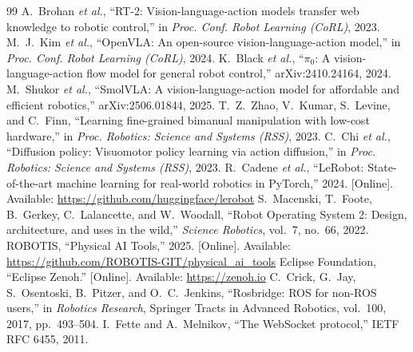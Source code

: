 \documentclass[conference]{IEEEtran}
\begin{document}
\begin{thebibliography}{99}
 A.~Brohan \emph{et al.}, ``RT-2: Vision-language-action models transfer web knowledge to robotic control,'' in \emph{Proc. Conf. Robot Learning (CoRL)}, 2023.
 M.~J.~Kim \emph{et al.}, ``OpenVLA: An open-source vision-language-action model,'' in \emph{Proc. Conf. Robot Learning (CoRL)}, 2024.
 K.~Black \emph{et al.}, ``$\pi_0$: A vision-language-action flow model for general robot control,'' arXiv:2410.24164, 2024.
 M.~Shukor \emph{et al.}, ``SmolVLA: A vision-language-action model for affordable and efficient robotics,'' arXiv:2506.01844, 2025.
 T.~Z.~Zhao, V.~Kumar, S.~Levine, and C.~Finn, ``Learning fine-grained bimanual manipulation with low-cost hardware,'' in \emph{Proc. Robotics: Science and Systems (RSS)}, 2023.
 C.~Chi \emph{et al.}, ``Diffusion policy: Visuomotor policy learning via action diffusion,'' in \emph{Proc. Robotics: Science and Systems (RSS)}, 2023.
 R.~Cadene \emph{et al.}, ``LeRobot: State-of-the-art machine learning for real-world robotics in PyTorch,'' 2024. [Online]. Available: \url{https://github.com/huggingface/lerobot}
 S.~Macenski, T.~Foote, B.~Gerkey, C.~Lalancette, and W.~Woodall, ``Robot Operating System 2: Design, architecture, and uses in the wild,'' \emph{Science Robotics}, vol.~7, no.~66, 2022.
 ROBOTIS, ``Physical AI Tools,'' 2025. [Online]. Available: \url{https://github.com/ROBOTIS-GIT/physical_ai_tools}
 Eclipse Foundation, ``Eclipse Zenoh.'' [Online]. Available: \url{https://zenoh.io}
 C.~Crick, G.~Jay, S.~Osentoski, B.~Pitzer, and O.~C.~Jenkins, ``Rosbridge: ROS for non-ROS users,'' in \emph{Robotics Research}, Springer Tracts in Advanced Robotics, vol.~100, 2017, pp.~493--504.
 I.~Fette and A.~Melnikov, ``The WebSocket protocol,'' IETF RFC 6455, 2011.
\end{thebibliography}
\end{document}
